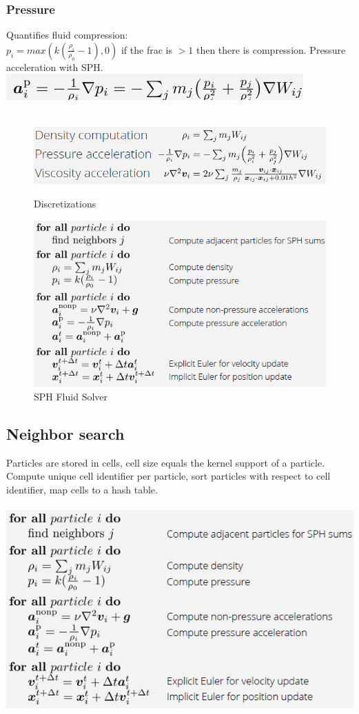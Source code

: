 \documentclass{article}
\begin{document}
\subsubsection{Pressure}
Quantifies fluid compression:\\
$p_i = max(k(\frac{\rho_i}{\rho_0} -1),0)$ if the frac is $>1$ then there is compression. Pressure acceleration with SPH.\\
\includegraphics[scale=0.5]{image99.png}\\\\
\begin{figure}
\includegraphics[scale=0.5]{image100.png}
\caption{Discretizations}
\includegraphics[scale=0.5]{1.png}
\caption{SPH Fluid Solver}
\end{figure}
\subsection{Neighbor search}
Particles are stored in cells, cell size equals the kernel support of a particle. Compute unique cell identifier per particle, sort particles with respect to cell identifier, map cells to a hash table.\\\\
\includegraphics[scale=0.5]{1.png}\\\\
\end{document}
